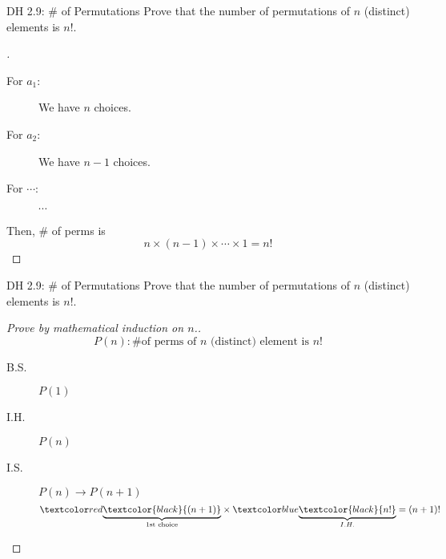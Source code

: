 \begin{frame}{}
  \begin{description}
    \centering
    \item[\Large Generating All Permutations]
  \end{description}

\end{frame}

\begin{frame}{}
  \begin{exampleblock}{DH 2.9: \# of Permutations}
    Prove that the number of permutations of $n$ (distinct) elements is $n!$.
  \end{exampleblock}

  \pause
  \begin{proof}[]
    \begin{description}
      \item[For $a_1$:] We have $n$ choices.
      \item[For $a_2$:] We have $n-1$ choices.
      \item[For $\cdots$:] $\cdots$
    \end{description}
    Then, \# of perms is 
    \[
      n \times (n-1) \times \cdots \times 1 = n!
    \]
  \end{proof}

  \vspace{0.60cm}
\end{frame}

\begin{frame}{}
  \begin{exampleblock}{DH 2.9: \# of Permutations}
    Prove that the number of permutations of $n$ (distinct) elements is $n!$.
  \end{exampleblock}

  \vspace{0.60cm}
  \begin{proof}[Prove by mathematical induction on $n$.]
    \[
      P(n): \text{\# of perms of } n \text{ (distinct) element is } n!
    \]

    \pause
    \begin{description}
      \item[B.S.] $P(1)$
      \item[I.H.] $P(n)$
      \item[I.S.] $P(n) \to P(n+1)$
	\pause
	\[
	  \red{\underbrace{\textcolor{black}{(n + 1)}}_{\text{1st choice}}} 
	  \times \blue{\underbrace{\textcolor{black}{n!}}_{I.H.}} = (n + 1)!
	\]
    \end{description}
  \end{proof}
\end{frame}

